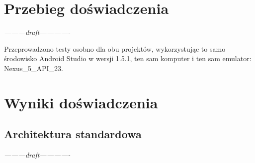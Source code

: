 \section{Przebieg doświadczenia}
\textit{---------draft-------------}

Przeprowadzono testy osobno dla obu projektów, wykorzystując to samo środowisko Android Studio w wersji 1.5.1, ten sam komputer i ten sam emulator: Nexus\_5\_API\_23.

\newpage
\section{Wyniki doświadczenia}
\label{wyniki_doswiadczenia}
\subsection{Architektura standardowa}
\textit{---------draft-------------}

